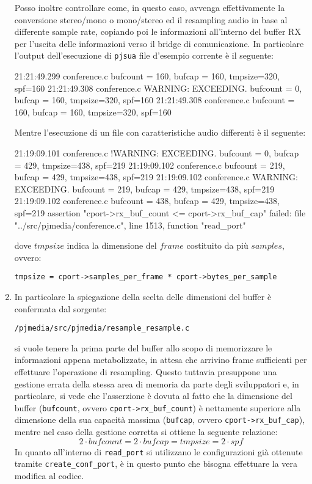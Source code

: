\begin{enumerate}
	Posso inoltre controllare come, in questo caso, avvenga effettivamente
	la conversione stereo/mono o mono/stereo ed il resampling audio in base
	al differente sample rate, copiando poi le informazioni all'interno
	del buffer RX per l'uscita delle informazioni verso il bridge di 
	comunicazione. In particolare l'output dell'esecuzione di \texttt{\small pjsua} 
	file d'esempio corrente è il seguente:
\begin{bash}
21:21:49.299   conference.c  bufcount = 160, bufcap = 160, tmpsize=320, spf=160
21:21:49.308   conference.c  WARNING: EXCEEDING. bufcount = 0, bufcap = 160, tmpsize=320, spf=160
21:21:49.308   conference.c  bufcount = 160, bufcap = 160, tmpsize=320, spf=160
\end{bash}
	Mentre l'esecuzione di un file con caratteristiche audio differenti è il 
	seguente:
\begin{bash}
21:19:09.101   conference.c !WARNING: EXCEEDING. bufcount = 0, bufcap = 429, tmpsize=438, spf=219
21:19:09.102   conference.c  bufcount = 219, bufcap = 429, tmpsize=438, spf=219
21:19:09.102   conference.c  WARNING: EXCEEDING. bufcount = 219, bufcap = 429, tmpsize=438, spf=219
21:19:09.102   conference.c  bufcount = 438, bufcap = 429, tmpsize=438, spf=219
assertion "cport->rx_buf_count <= cport->rx_buf_cap" failed: file "../src/pjmedia/conference.c", line 1513, function "read_port"
\end{bash}	
	dove $tmpsize$ indica la dimensione del $frame$ costituito da più $samples$,
	ovvero:
	\begin{center}
	\texttt{\small tmpsize = cport->samples\_per\_frame * cport->bytes\_per\_sample}
	\end{center}
\item 	In particolare la spiegazione della scelta delle dimensioni del buffer
	è confermata dal sorgente:
	\begin{center}
	\texttt{\small \PJA/pjmedia/src/pjmedia/resample\_resample.c}
	\end{center}
	si vuole tenere la prima parte del buffer allo scopo di memorizzare le
	informazioni appena metabolizzate, in attesa che arrivino frame sufficienti
	per effettuare l'operazione di resampling. Questo tuttavia presuppone
	una gestione errata della stessa area di memoria da parte degli sviluppatori 
	e, in particolare, si vede che l'asserzione è dovuta al fatto che la 
	dimensione del buffer (\texttt{\small bufcount}, ovvero \texttt{\small cport->rx\_buf\_count})
	è nettamente superiore alla dimensione della sua capacità massima
	(\texttt{\small bufcap}, ovvero \texttt{\small cport->rx\_buf\_cap}), mentre
	nel caso della gestione corretta si ottiene la seguente relazione:
	\[2\cdot bufcount=2\cdot bufcap= tmpsize = 2\cdot spf\]
	In quanto all'interno di \texttt{\small read\_port} si utilizzano le configurazioni
	già ottenute tramite \texttt{\small create\_conf\_port}, è in questo 
	punto che bisogna effettuare la vera modifica al codice.
	

\end{enumerate}

